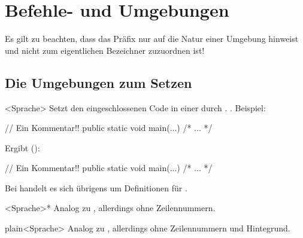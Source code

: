 \documentclass{sopra-base}
\begin{document}
\section{Befehle- und Umgebungen}

Es gilt zu beachten, dass das Präfix  nur auf die Natur einer Umgebung hinweist und nicht zum eigentlichen Bezeichner zuzuordnen ist!


\subsection{Die Umgebungen zum Setzen}


\begin{environment}{<Sprache>}{}
    Setzt den eingeschlossenen Code in einer durch  . . 
    Beispiel:\smallskip\\ %
    \begin{latex}
\begin{java}
// Ein Kommentar!!
public static void main(...){ /* ... */ }
\end{java}
    \end{latex}
    Ergibt ():
\begin{java}
// Ein Kommentar!!
public static void main(...){ /* ... */ }
\end{java}
    Bei  handelt es sich übrigens um Definitionen für .
\end{environment}

\begin{environment}{<Sprache>*}{}
    Analog zu , allerdings ohne Zeilennummern.
\end{environment}

\begin{environment}{plain<Sprache>}{}
    Analog zu , allerdings ohne Zeilennummern und Hintegrund.
\end{environment}
\end{document}
